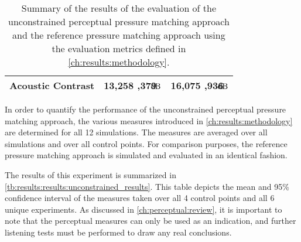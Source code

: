 \begin{table}[]
\begin{tabular}{lS[round-mode=places]S[round-mode=places]}
    Acoustic Contrast   & 13,258 ,379 $\mathrm{\hspace{-12pt}dB}$  & 16,075  ,936 $\mathrm{\hspace{-12pt}dB}$  \\ 
    \bottomrule
\end{tabular}
    \caption{Summary of the results of the evaluation of the unconstrained perceptual pressure matching approach 
        and the reference pressure matching approach using the evaluation metrics defined in 
        \autoref{ch:results:methodology}.}
    \label{tb:results:results:unconstrained_results}
\end{table}
In order to quantify the performance of the unconstrained perceptual pressure matching approach, the various 
measures introduced in \autoref{ch:results:methodology} are determined for all 12 simulations.
The measures are averaged over all simulations and over all control points.
For comparison purposes, the reference pressure matching approach is 
simulated and evaluated in an identical fashion.

The results of this experiment is summarized in \autoref{tb:results:results:unconstrained_results}.
This table depicts the mean and 95\% confidence interval of the measures taken 
over all 4 control points and all 6 unique experiments.
As discussed in \autoref{ch:perceptual:review}, it is important to note that the perceptual measures can only
be used as an indication, and further listening tests must be performed to draw any real conclusions.

